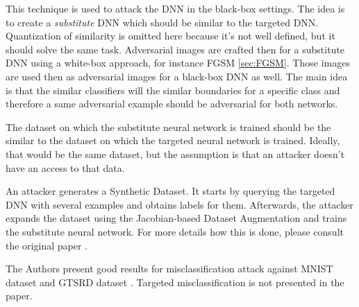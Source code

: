 This technique is used to attack the DNN in the black-box settings. The idea is to create a \textit{substitute} DNN which should be similar to the targeted DNN. Quantization of similarity is omitted here because it's not well defined, but it should solve the same task.  Adversarial images are crafted then for a substitute DNN using a white-box approach, for instance FGSM \ref{sec:FGSM}. Those images are used then as adversarial images for a black-box DNN as well. The main idea is that the similar classifiers will the similar boundaries for a specific class and therefore a same adversarial example should be adversarial for both networks. 

The dataset on which the substitute neural network is trained should be the similar to the dataset on which the targeted neural network is trained. Ideally, that would be the same dataset, but the assumption is that an attacker doesn't have an access to that data. 

An attacker generates a Synthetic Dataset. It starts by querying the targeted DNN with several examples and obtains labels for them. Afterwards, the attacker expands the dataset using the Jacobian-based Dataset Augmentation and trains the substitute neural network. For more details how this is done, please consult the original paper  \cite{DBLP:journals/corr/PapernotMGJCS16}.


The Authors present good results for misclassification attack against MNIST dataset and GTSRD dataset \cite{datasetGTSRD}. Targeted misclassification is not presented in the paper.